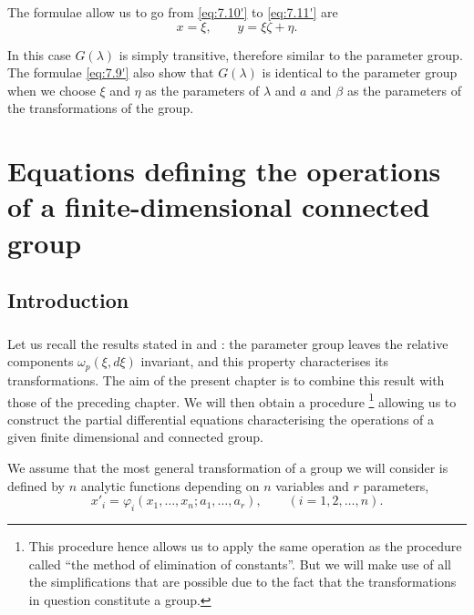\documentclass[leqno,11pt]{book}
\makeatletter
\numberwithin{equation}{chapter}
\theoremstyle{shape1}
\theoremstyle{shapesmall}
\let\old@phi\phi
\let\old@varphi\varphi
\let\phi\old@varphi
\let\varphi\old@phi
\makeatother
\begin{document}
{The formulae allow us to go from \eqref{eq:7.10'} to \eqref{eq:7.11'} are
\begin{equation}
  \label{eq:7.12}\tag{12$'$}
  x=\xi,\qquad y=\xi\zeta+\eta.
\end{equation}

In this case $G(\lambda)$ is simply transitive, therefore similar to the parameter group. The formulae \eqref{eq:7.9'} also show that $G(\lambda)$ is identical to the parameter group when we choose $\xi$ and $\eta$ as the parameters of $\lambda$ and $a$ and $\beta$ as the parameters of the transformations of the group.
}



\chapter{Equations defining the operations of a finite-dimensional connected group}
\label{cha:equat-defin-oper}

\section*{Introduction}
\label{sec:introduction-2}

\paragraph{}
\label{sec:105}
Let us recall the results stated in \pageref{sec:80} and \pageref{sec:83}: the parameter group leaves the relative components $\omega_{p}(\xi,d\xi)$ invariant, and this property characterises its transformations. The aim of the present chapter is to combine this result with those of the preceding chapter. We will then obtain a procedure \footnote{This procedure hence allows us to apply the same operation as the procedure called ``the method of elimination of constants''. But we will make use of all the simplifications that are possible due to the fact that the transformations in question constitute a group.} allowing us to construct the partial differential equations characterising the operations of a given finite dimensional and connected group. 

We assume that the most general transformation of a group we will consider is defined by $n$ analytic functions depending on $n$ variables and $r$ parameters,
\begin{equation}
  \label{eq:8.1}
  x'_{i}=\phi_{i}(x_{1},\dots,x_{n};a_{1},\dots,a_{r}),\qquad(i=1,2,\dots,n).
\end{equation}
\end{document}
